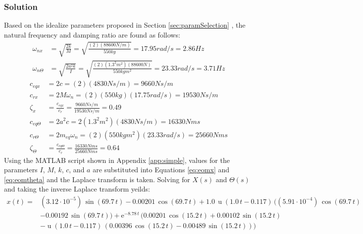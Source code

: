 \documentclass[12pt]{article}
\begin{document}
\subsubsection{Solution}
Based on the idealize parameters proposed in Section \ref{sec:paramSelection} , the natural frequency and damping ratio are found as follows: 
\begin{equation}
	\begin{split}
	\omega _{nx} &= \sqrt{\frac{2k}{M}} = \sqrt{\frac{(2)(88600N/m)}{550kg}} = 17.95rad/s = 2.86Hz \\
	\omega _{n\Theta} &= \sqrt{\frac{2a^2k}{I}} = \sqrt{\frac{(2)(1.3^2m^2)(88600N)}{550kgm^2}} = 23.33rad/s = 3.71Hz 
	\end{split}  
\end{equation}
\begin{equation}
	\begin{split}
		c_{eqx} &= 2c = (2)(4830Ns/m) = 9660Ns/m \\ 
		c_{rx} &= 2M\omega _n = (2)(550kg)(17.75rad/s) = 19530Ns/m \\ 
		\zeta _x& = \frac{c_{eqx}}{c_r} = \frac{9660Ns/m}{19530Ns/m} = 0.49\\
		c_{eq\Theta} &= 2a^2c =  2(1.3^2m^2)(4830Ns/m) = 16330Nms\\
		c_{r\Theta} &= 2m_{eq}\omega _n = (2)(550kgm^2)(23.33rad/s) = 25660Nms\\ 
		\zeta _\Theta &= \frac{c_{eq\Theta}}{c_r} = \frac{16330Nms}{ 25660Nms} = 0.64
	\end{split}  
\end{equation}
Using the MATLAB script shown in Appendix \ref{app:simple}, values for the parameters $I$, $M$, $k$, $c$, and $a$ are substituted into Equations \ref{eq:eomx} and \ref{eq:eomtheta} and the Laplace transform is taken. Solving for $X(s)$ and $\Theta(s)$ and taking the inverse Laplace transform yeilds:
\begin{equation}
		\begin{split}
		x(t) = &(3.12\cdot 10^{-5})\, \sin\!(69.7\, t) - 0.00201\, \cos\!(69.7\, t) + 1.0\, \mathop{\mathrm{u}}\nolimits\!(1.0\, t - 0.117)\, ((5.91\cdot 10^{-4})\, \cos\!(69.7\, t) \\
		&- 0.00192\, \sin\!(69.7\, t)) + \mathrm{e}^{- 8.78\, t}\, (0.00201\, \cos\!(15.2\, t) + 0.00102\, \sin\!(15.2\, t) \\
		&- \mathop{\mathrm{u}}\nolimits\!(1.0\, t - 0.117)\, (0.00396\, \cos\!(15.2\, t) - 0.00489\, \sin\!(15.2\, t)))
		\end{split}
\end{equation} 
\end{document}
